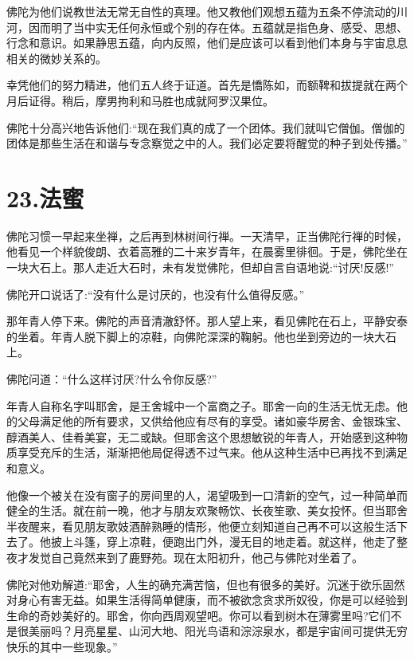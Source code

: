 \documentclass[12pt,twoside,openany]{book}
\begin{document}
佛陀为他们说教世法无常无自性的真理。他又教他们观想五蕴为五条不停流动的川河，因而明了当中实无任何永恒或个别的存在体。五蕴就是指色身、感受、思想、行念和意识。如果静思五蕴，向内反照，他们是应该可以看到他们本身与宇宙息息相关的微妙关系的。

幸凭他们的努力精进，他们五人终于证道。首先是憍陈如，而额鞞和拔提就在两个月后证得。稍后，摩男拘利和马胜也成就阿罗汉果位。

佛陀十分高兴地告诉他们:“现在我们真的成了一个团体。我们就叫它僧伽。僧伽的团体是那些生活在和谐与专念察觉之中的人。我们必定要将醒觉的种子到处传播。”


\chapter{23.法蜜}\label{ch23}

佛陀习惯一早起来坐禅，之后再到林树间行禅。一天清早，正当佛陀行禅的时候，他看见一个样貌俊朗、衣着高雅的二十来岁青年，在晨雾里徘徊。于是，佛陀坐在一块大石上。那人走近大石时，未有发觉佛陀，但却自言自语地说:“讨厌!反感!”

佛陀开口说话了:“没有什么是讨厌的，也没有什么值得反感。”

那年青人停下来。佛陀的声音清澈舒怀。那人望上来，看见佛陀在石上，平静安泰的坐着。年青人脱下脚上的凉鞋，向佛陀深深的鞠躬。他也坐到旁边的一块大石上。

佛陀问道：“什么这样讨厌?什么令你反感?”

年青人自称名字叫耶舍，是王舍城中一个富商之子。耶舍一向的生活无忧无虑。他的父母满足他的所有要求，又供给他应有尽有的享受。诸如豪华房舍、金银珠宝、醇酒美人、佳肴美宴，无二或缺。但耶舍这个思想敏锐的年青人，开始感到这种物质享受充斥的生活，渐渐把他局促得透不过气来。他从这种生活中已再找不到满足和意义。

他像一个被关在没有窗子的房间里的人，渴望吸到一口清新的空气，过一种简单而健全的生活。就在前一晚，他才与朋友欢聚畅饮、长夜笙歌、美女投怀。但当耶舍半夜醒来，看见朋友歌妓酒醉熟睡的情形，他便立刻知道自己再不可以这般生活下去了。他披上斗篷，穿上凉鞋，便跑出门外，漫无目的地走着。就这样，他走了整夜才发觉自己竟然来到了鹿野苑。现在太阳初升，他己与佛陀对坐着了。

佛陀对他劝解道:“耶舍，人生的确充满苦恼，但也有很多的美好。沉迷于欲乐固然对身心有害无益。如果生活得简单健康，而不被欲念贪求所奴役，你是可以经验到生命的奇妙美好的。耶舍，你向西周观望吧。你可以看到树木在薄雾里吗?它们不是很美丽吗？月亮星星、山河大地、阳光鸟语和淙淙泉水，都是宇宙间可提供无穷快乐的其中一些现象。”
\end{document}
